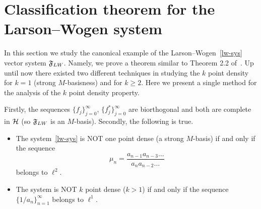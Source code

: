 \section{Classification theorem for the Larson--Wogen system}
  \label{section:lw-sys}
  In this section we study the canonical example of the Larson--Wogen~\eqref{lw-sys} vector system $\fsys_{LW}$.
  Namely, we prove a theorem similar to Theorem 2.2 of~\cite{katavolos}.
  Up until now there existed two different techniques in studying the $k$ point density for $k=1$ (strong $M$-basisness) and for $k\geq2$.
  Here we present a single method for the analysis of the $k$ point density property.
  \begin{theorem}
    \label{thm:katavolos}
    Firstly, the sequences $\{f_j\}_{j=0}^\infty$, $\{f^*_j\}_{j=0}^\infty$ are biorthogonal
      and both are complete in $\cal{H}$ (so $\fsys_{LW}$ is an $M$-basis).
    Secondly, the following is true.
    \begin{itemize}
      \item  The system~\eqref{lw-sys} is NOT one point dense (a strong $M$-basis) if and only if the sequence
        \begin{equation}
          \mu_n = \frac{a_{n-1} a_{n-3} \dots}{a_{n} a_{n-2} \dots }
        \end{equation}
        belongs to $\ell^2$.
      \item The system is NOT $k$ point dense ($k > 1$) if and only if the sequence $\{1/a_n\}_{n=1}^\infty$ belongs to $\ell^1$.
    \end{itemize}
  \end{theorem}

